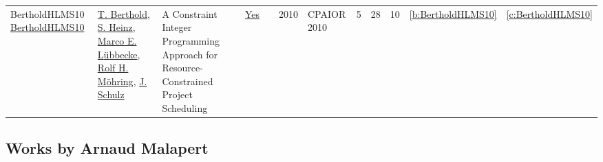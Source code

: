 {\begin{longtable}{>{\raggedright\arraybackslash}p{3cm}>{\raggedright\arraybackslash}p{6cm}>{\raggedright\arraybackslash}p{6.5cm}rrrp{2.5cm}rrrrr}
BertholdHLMS10 \href{https://doi.org/10.1007/978-3-642-13520-0\_34}{BertholdHLMS10} & \hyperref[auth:a357]{T. Berthold}, \hyperref[auth:a134]{S. Heinz}, \hyperref[auth:a358]{Marco E. L{\"{u}}bbecke}, \hyperref[auth:a359]{Rolf H. M{\"{o}}hring}, \hyperref[auth:a135]{J. Schulz} & A Constraint Integer Programming Approach for Resource-Constrained Project Scheduling & \href{works/BertholdHLMS10.pdf}{Yes} & \cite{BertholdHLMS10} & 2010 & CPAIOR 2010 & 5 & 28 & 10 & \ref{b:BertholdHLMS10} & \ref{c:BertholdHLMS10}\\
\end{longtable}
}

\subsection{Works by Arnaud Malapert}
\label{sec:a82}
